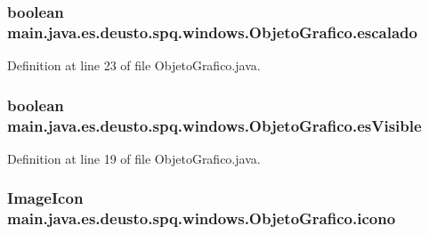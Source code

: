 \subsubsection[{\texorpdfstring{escalado}{escalado}}]{\setlength{\rightskip}{0pt plus 5cm}boolean main.\+java.\+es.\+deusto.\+spq.\+windows.\+Objeto\+Grafico.\+escalado\hspace{0.3cm}{\ttfamily [protected]}}\hypertarget{classmain_1_1java_1_1es_1_1deusto_1_1spq_1_1windows_1_1_objeto_grafico_a751c7dffa70c3f3da364d7fef5f8e0c4}{}\label{classmain_1_1java_1_1es_1_1deusto_1_1spq_1_1windows_1_1_objeto_grafico_a751c7dffa70c3f3da364d7fef5f8e0c4}


Definition at line 23 of file Objeto\+Grafico.\+java.

\subsubsection[{\texorpdfstring{es\+Visible}{esVisible}}]{\setlength{\rightskip}{0pt plus 5cm}boolean main.\+java.\+es.\+deusto.\+spq.\+windows.\+Objeto\+Grafico.\+es\+Visible\hspace{0.3cm}{\ttfamily [protected]}}\hypertarget{classmain_1_1java_1_1es_1_1deusto_1_1spq_1_1windows_1_1_objeto_grafico_a87de9fa710e3a57cda731cba8a2c5bde}{}\label{classmain_1_1java_1_1es_1_1deusto_1_1spq_1_1windows_1_1_objeto_grafico_a87de9fa710e3a57cda731cba8a2c5bde}


Definition at line 19 of file Objeto\+Grafico.\+java.

\subsubsection[{\texorpdfstring{icono}{icono}}]{\setlength{\rightskip}{0pt plus 5cm}Image\+Icon main.\+java.\+es.\+deusto.\+spq.\+windows.\+Objeto\+Grafico.\+icono\hspace{0.3cm}{\ttfamily [protected]}}\hypertarget{classmain_1_1java_1_1es_1_1deusto_1_1spq_1_1windows_1_1_objeto_grafico_a28289aaee40dfd19df3f653f30048176}{}\label{classmain_1_1java_1_1es_1_1deusto_1_1spq_1_1windows_1_1_objeto_grafico_a28289aaee40dfd19df3f653f30048176}


